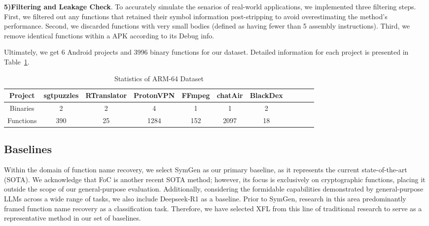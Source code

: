 \documentclass[acmsmall,screen,review,anonymous]{acmart} %
\begin{document}
\textbf{5)Filtering and Leakage Check}. To accurately simulate the senarios of real-world applications, we implemented three filtering steps. First, we filtered out any functions that retained their symbol information post-stripping to avoid overestimating the method's performance. Second, we discarded functions with very small bodies (defined as having fewer than 5 assembly instructions). Third, we remove identical functions within a APK according to its Debug info.

Ultimately, we get 6 Android projects and 3996 binary functions for our dataset. Detailed information for each project is presented in Table~\ref{tab:arm_dataset_stats}.
\renewcommand\arraystretch{1.31}
\vspace{-0.5em} %
\begin{table}[!ht]
    \caption{Statistics of ARM-64 Dataset}
    \label{tab:arm_dataset_stats}
    \centering
    \begin{tabular}{ccccccccccc}
        \toprule
        \textbf{Project} & \textbf{sgtpuzzles} & \textbf{RTranslator} & \textbf{ProtonVPN} & \textbf{FFmpeg} & \textbf{chatAir} & \textbf{BlackDex} \\
        \midrule
        Binaries & 2 & 2 & 4 & 1 & 1 & 2 \\
        Functions & 390 & 25 & 1284 & 152 & 2097 & 18 \\
        \bottomrule
    \end{tabular}
\end{table}
\vspace{-1em} %
\renewcommand\arraystretch{1.0}


\subsection{Baselines}
Within the domain of function name recovery, we select SymGen\cite{SymGen} as our primary baseline, as it represents the current state-of-the-art (SOTA). We acknowledge that FoC\cite{FoC} is another recent SOTA method; however, its focus is exclusively on cryptographic functions, placing it outside the scope of our general-purpose evaluation. Additionally, considering the formidable capabilities demonstrated by general-purpose LLMs across a wide range of tasks, we also include Deepseek-R1\cite{Deepseek-R1} as a baseline. Prior to SymGen\cite{SymGen}, research in this area predominantly framed function name recovery as a classification task. Therefore, we have selected XFL\cite{XFL} from this line of traditional research to serve as a representative method in our set of baselines.
\end{document}
